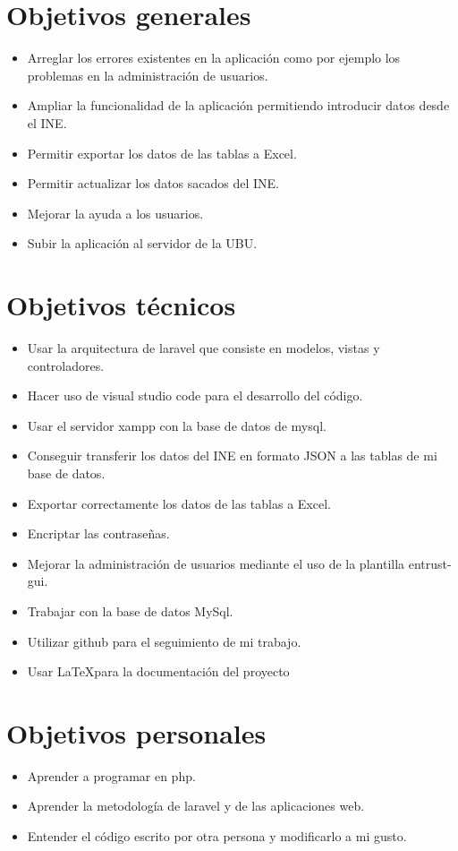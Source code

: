 \section{Objetivos generales}
\begin{itemize}
	\item Arreglar los errores existentes en la aplicación como por ejemplo los problemas en la administración de usuarios. 
	\item Ampliar la funcionalidad de la aplicación permitiendo introducir datos desde el INE.
	\item Permitir exportar los datos de las tablas a Excel.
	\item Permitir actualizar los datos sacados del INE.
	\item Mejorar la ayuda a los usuarios.
	\item Subir la aplicación al servidor de la UBU.
\end{itemize}
\section{Objetivos técnicos}
\begin{itemize}
	\item Usar la arquitectura de laravel que consiste en modelos, vistas y controladores.
	\item Hacer uso de visual studio code para el desarrollo del código.
	\item Usar el servidor xampp con la base de datos de mysql.
	\item Conseguir transferir los datos del INE en formato JSON a las tablas de mi base de datos.
	\item Exportar correctamente los datos de las tablas a Excel.
	\item Encriptar las contraseñas.
	\item Mejorar la administración de usuarios mediante el uso de la plantilla entrust-gui.
	\item Trabajar con la base de datos MySql.
	\item Utilizar github para el seguimiento de mi trabajo.
	\item Usar \LaTeX para la documentación del proyecto
\end{itemize}
\section{Objetivos personales}
\begin{itemize}
	\item Aprender a programar en php.
	\item Aprender la metodología de laravel y de las aplicaciones web.
	\item Entender el código escrito por otra persona y modificarlo a mi gusto.
\end{itemize}